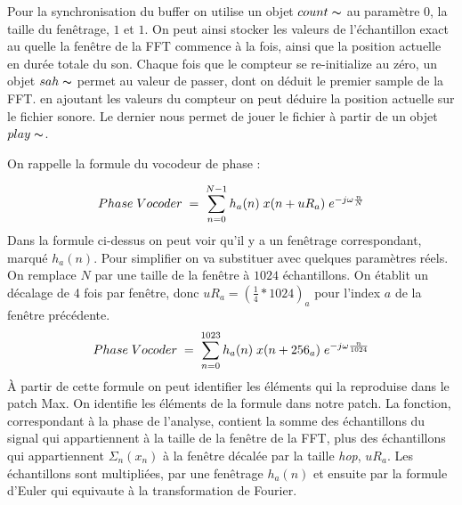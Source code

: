 Pour la synchronisation du buffer on utilise un objet $count\thicksim$ au paramètre $0$, la taille du fenêtrage, $1$ et $1$. On peut ainsi stocker les valeurs de l'échantillon exact au quelle la fenêtre de la FFT commence à la fois, ainsi que la position actuelle en durée totale du son. Chaque fois que le compteur se re-initialize au zéro, un objet $sah\thicksim$ permet au valeur de passer, dont on déduit le premier sample de la FFT. en ajoutant les valeurs du compteur on peut déduire la position actuelle sur le fichier sonore. Le dernier nous permet de jouer le fichier à partir de un objet $play\thicksim$. 

On rappelle la formule du vocodeur de phase : 

    \begin{equation*}
    Phase \; Vocoder \; = \; \sum_{n=0} ^{N-1} h_a(n) \; x(n + uR_a) \; e^{-j \omega \frac{n}{N}} \vspace{0.5cm} 
    \end{equation*}
Dans la formule ci-dessus on peut voir qu'il y a un fenêtrage correspondant, marqué $h_a(n)$. Pour simplifier on va substituer avec quelques paramètres réels. On remplace $N$ par une taille de la fenêtre à $1024$ échantillons. On établit un décalage de 4 fois par fenêtre, donc $uR_a = (\frac{1}{4} * 1024)_a$ pour l'index $a$ de la fenêtre précédente.  
    \begin{equation*}
    Phase \; Vocoder \; = \; \sum_{n=0} ^{1023} h_a(n) \; x(n + 256_a) \; e^{-j \omega \frac{n}{1024}} \vspace{0.5cm} 
    \end{equation*}
À partir de cette formule on peut identifier les éléments qui la reproduise dans le patch Max. On identifie les éléments de la formule dans notre patch. La fonction, correspondant à la phase de l'analyse, contient la somme des échantillons du signal qui appartiennent à la taille de la fenêtre de la FFT, plus des échantillons qui appartiennent $\Sigma_n (x_n) $ à la fenêtre décalée par la taille \textit{hop}, $uR_a$. Les échantillons sont multipliées, par une fenêtrage $h_a(n)$ et ensuite par la formule d'Euler qui equivaute à la transformation de Fourier.

